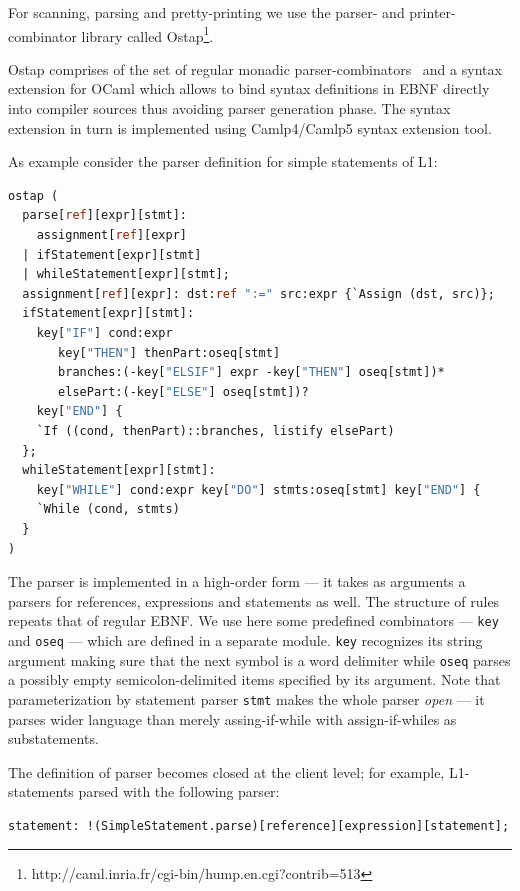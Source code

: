 For scanning, parsing and pretty-printing we use the parser- and printer-combinator
library called Ostap\footnote{http://caml.inria.fr/cgi-bin/hump.en.cgi?contrib=513}. 

Ostap comprises of the set of regular monadic parser-combinators~\cite{MonadicParserCombinators} 
and a syntax extension for OCaml which allows to bind syntax definitions in
EBNF directly into compiler sources thus avoiding parser generation phase. The syntax
extension in turn is implemented using Camlp4/Camlp5 syntax extension 
tool. 

As example consider the parser definition for simple statements of L1:

\begin{lstlisting}[language=ocaml]
ostap (
  parse[ref][expr][stmt]: 
    assignment[ref][expr] 
  | ifStatement[expr][stmt] 
  | whileStatement[expr][stmt];
  assignment[ref][expr]: dst:ref ":=" src:expr {`Assign (dst, src)};
  ifStatement[expr][stmt]: 
    key["IF"] cond:expr 
       key["THEN"] thenPart:oseq[stmt]
       branches:(-key["ELSIF"] expr -key["THEN"] oseq[stmt])*
       elsePart:(-key["ELSE"] oseq[stmt])?
    key["END"] {
    `If ((cond, thenPart)::branches, listify elsePart)
  };
  whileStatement[expr][stmt]: 
    key["WHILE"] cond:expr key["DO"] stmts:oseq[stmt] key["END"] {
    `While (cond, stmts)
  }
)
\end{lstlisting}

The parser is implemented in a high-order form --- it takes as arguments a parsers
for references, expressions and statements as well. The structure of rules
repeats that of regular EBNF. We use here some predefined combinators --- \lstinline{key} 
and \lstinline{oseq} --- which are defined in a separate module. \lstinline{key} recognizes
its string argument making sure that the next symbol is a word delimiter while \lstinline{oseq}
parses a possibly empty semicolon-delimited items specified by its argument. Note that 
parameterization by statement parser \lstinline{stmt} makes the whole parser \emph{open} ---
it parses wider language than merely assing-if-while with assign-if-whiles as substatements.

The definition of parser becomes closed at the client level; for example, L1-statements
parsed with the following parser:

\begin{lstlisting}[language=ocaml]
statement: !(SimpleStatement.parse)[reference][expression][statement];
\end{lstlisting}

